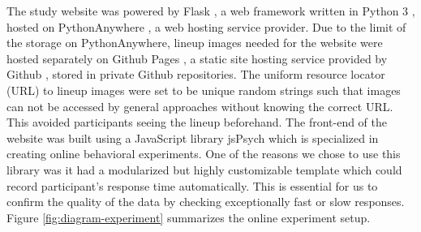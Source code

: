 \documentclass{monashthesis}
\theoremstyle{definition}
\theoremstyle{definition}
\theoremstyle{definition}
\theoremstyle{definition}
\theoremstyle{remark}
\begin{document}
\begin{table}

\caption{\label{tab:lineup-reason}Explanations about reasons for choosing data plots from a lineup}
\centering
{}
\end{table}

The study website was powered by Flask \autocite{grinberg_flask_2018}, a web framework written in Python 3 \autocite{van_rossum_python_2009}, hosted on PythonAnywhere \autocite{pythonanywhere_pythonanywhere_2022}, a web hosting service provider. Due to the limit of the storage on PythonAnywhere, lineup images needed for the website were hosted separately on Github Pages \autocite{gtihub_github_2022-1}, a static site hosting service provided by Github \autocite{gtihub_github_2022}, stored in private Github repositories. The uniform resource locator (URL) to lineup images were set to be unique random strings such that images can not be accessed by general approaches without knowing the correct URL. This avoided participants seeing the lineup beforehand. The front-end of the website was built using a JavaScript \autocite{flanagan_javascript_2006} library jsPsych \autocite{de_leeuw_jspsych_2015} which is specialized in creating online behavioral experiments. One of the reasons we chose to use this library was it had a modularized but highly customizable template which could record participant's response time automatically. This is essential for us to confirm the quality of the data by checking exceptionally fast or slow responses. Figure \ref{fig:diagram-experiment} summarizes the online experiment setup.
\end{document}
